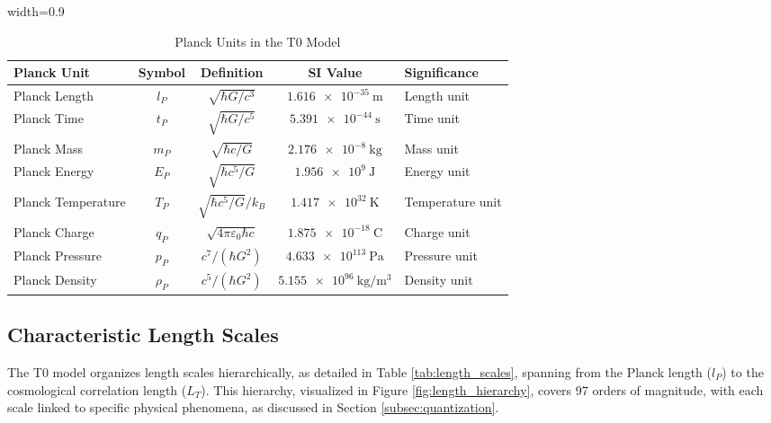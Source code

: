 \documentclass[12pt,a4paper]{article}
\newcommand{\tablescale}{0.9}
\begin{document}
	\begin{table}[htbp]
		\centering
		\begin{adjustbox}{width=\tablescale\textwidth}
			\begin{tabular}{lcccl}
				\toprule
				\textbf{Planck Unit} & \textbf{Symbol} & \textbf{Definition} & \textbf{SI Value} & \textbf{Significance} \\
				\midrule
				Planck Length & \(l_P\) & \(\sqrt{\hbar G/c^3}\) & \(\SI{1.616e-35}{\meter}\) & Length unit \\
				Planck Time & \(t_P\) & \(\sqrt{\hbar G/c^5}\) & \(\SI{5.391e-44}{\second}\) & Time unit \\
				Planck Mass & \(m_P\) & \(\sqrt{\hbar c/G}\) & \(\SI{2.176e-8}{\kilogram}\) & Mass unit \\
				Planck Energy & \(E_P\) & \(\sqrt{\hbar c^5/G}\) & \(\SI{1.956e9}{\joule}\) & Energy unit \\
				Planck Temperature & \(T_P\) & \(\sqrt{\hbar c^5/G}/k_B\) & \(\SI{1.417e32}{\kelvin}\) & Temperature unit \\
				Planck Charge & \(q_P\) & \(\sqrt{4\pi \varepsilon_0 \hbar c}\) & \(\SI{1.875e-18}{\coulomb}\) & Charge unit \\
				Planck Pressure & \(p_P\) & \(c^7/(\hbar G^2)\) & \(\SI{4.633e113}{\pascal}\) & Pressure unit \\
				Planck Density & \(\rho_P\) & \(c^5/(\hbar G^2)\) & \(\SI{5.155e96}{\kilogram\per\meter\cubed}\) & Density unit \\
				\bottomrule
			\end{tabular}
		\end{adjustbox}
		\caption{Planck Units in the T0 Model}
		\label{tab:planck_units}
	\end{table}
	
	\subsection{Characteristic Length Scales}
	\label{sec:length_scales}
	
	The T0 model organizes length scales hierarchically, as detailed in Table \ref{tab:length_scales}, spanning from the Planck length (\(l_P\)) to the cosmological correlation length (\(L_T\)). This hierarchy, visualized in Figure \ref{fig:length_hierarchy}, covers 97 orders of magnitude, with each scale linked to specific physical phenomena, as discussed in Section \ref{subsec:quantization}.
	
\end{document}
